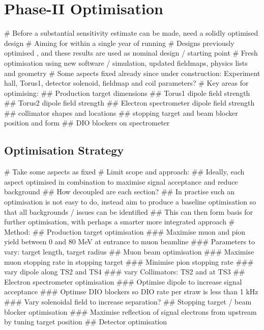 \chapter{Phase-II Optimisation}
\begin{easylist}
# Before a substantial sensitivity estimate can be made, need a solidly optimised design
# Aiming for \sensePII within a single year of running
# Designs previously optimised \cite{CDR}, and these results are used as nominal design / starting point
# Fresh optimisation using new software / simulation, updated fieldmaps, physics lists and geometry
# Some aspects fixed already since \phaseI under construction: Experiment hall, Torus1, detector solenoid, fieldmap and coil parameters?
# Key areas for optimising:
## Production target dimensions
## Torus1 dipole field strength
## Torus2 dipole field strength
## Electron spectrometer dipole field strength
## collimator shapes and locations
## stopping target and beam blocker position and form
## DIO blockers on spectrometer
\end{easylist}

\section{Optimisation Strategy}
\begin{easylist}
# Take some aspects as fixed
# Limit scope and approach:
## Ideally, each aspect optimised in combination to maximise signal acceptance and reduce background
## How decoupled are each section?
## In practise such an optimisation is not easy to do, instead aim to produce a baseline optimisation so that all backgrounds / issues can be identified
## This can then form basis for further optimisation, with perhaps a smarter more integrated approach
# Method:
## Production target optimisation
### Maximise muon and pion yield between 0 and 80 MeV at entrance to muon beamline
### Parameters to vary: target length, target radius
## Muon beam optimisation
### Maximise muon stopping rate in stopping target
### Minimise pion stopping rate
### vary dipole along TS2 and TS4
### vary Collimators: TS2 and at TS3
## Electron spectrometer optimisation
### Optimise dipole to increase signal acceptance
### Optimse DIO blockers so DIO rate per straw is less than 1 kHz
### Vary solenoidal field to increase separation?
## Stopping target / beam blocker optimisation
### Maximise reflection of signal electrons from upstream by tuning target position
## Detector optimisation
\end{easylist}

